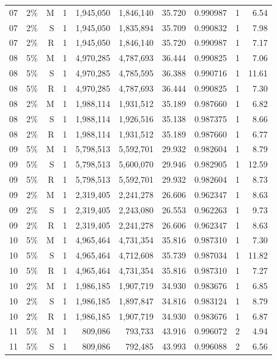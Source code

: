 \documentclass[UTF8,10pt,a4paper]{ctexart}
\begin{document}
\begin{longtable}{llrlrrrlrr}
07 & 2\% & M & 1 & 1,945,050 & 1,846,140 & 35.720 & 0.990987 & 1 & 6.54 \\
07 & 2\% & S & 1 & 1,945,050 & 1,835,894 & 35.709 & 0.990832 & 1 & 7.98 \\
07 & 2\% & R & 1 & 1,945,050 & 1,846,140 & 35.720 & 0.990987 & 1 & 7.17 \\
08 & 5\% & M & 1 & 4,970,285 & 4,787,693 & 36.444 & 0.990825 & 1 & 7.06 \\
08 & 5\% & S & 1 & 4,970,285 & 4,785,595 & 36.388 & 0.990716 & 1 & 11.61 \\
08 & 5\% & R & 1 & 4,970,285 & 4,787,693 & 36.444 & 0.990825 & 1 & 7.30 \\
08 & 2\% & M & 1 & 1,988,114 & 1,931,512 & 35.189 & 0.987660 & 1 & 6.82 \\
08 & 2\% & S & 1 & 1,988,114 & 1,926,516 & 35.138 & 0.987375 & 1 & 8.66 \\
08 & 2\% & R & 1 & 1,988,114 & 1,931,512 & 35.189 & 0.987660 & 1 & 6.77 \\
09 & 5\% & M & 1 & 5,798,513 & 5,592,701 & 29.932 & 0.982604 & 1 & 8.79 \\
09 & 5\% & S & 1 & 5,798,513 & 5,600,070 & 29.946 & 0.982905 & 1 & 12.59 \\
09 & 5\% & R & 1 & 5,798,513 & 5,592,701 & 29.932 & 0.982604 & 1 & 8.73 \\
09 & 2\% & M & 1 & 2,319,405 & 2,241,278 & 26.606 & 0.962347 & 1 & 8.63 \\
09 & 2\% & S & 1 & 2,319,405 & 2,243,080 & 26.553 & 0.962263 & 1 & 9.73 \\
09 & 2\% & R & 1 & 2,319,405 & 2,241,278 & 26.606 & 0.962347 & 1 & 8.63 \\
10 & 5\% & M & 1 & 4,965,464 & 4,731,354 & 35.816 & 0.987310 & 1 & 7.30 \\
10 & 5\% & S & 1 & 4,965,464 & 4,712,608 & 35.739 & 0.987034 & 1 & 11.82 \\
10 & 5\% & R & 1 & 4,965,464 & 4,731,354 & 35.816 & 0.987310 & 1 & 7.27 \\
10 & 2\% & M & 1 & 1,986,185 & 1,907,719 & 34.930 & 0.983676 & 1 & 6.85 \\
10 & 2\% & S & 1 & 1,986,185 & 1,897,847 & 34.816 & 0.983124 & 1 & 8.79 \\
10 & 2\% & R & 1 & 1,986,185 & 1,907,719 & 34.930 & 0.983676 & 1 & 6.87 \\
11 & 5\% & M & 1 & 809,086 & 793,733 & 43.916 & 0.996072 & 2 & 4.94 \\
11 & 5\% & S & 1 & 809,086 & 792,485 & 43.993 & 0.996088 & 2 & 6.56 \\

\end{longtable}
\end{document}
